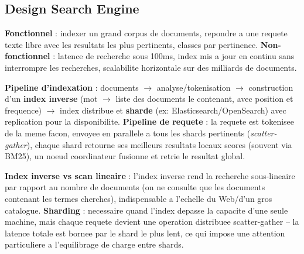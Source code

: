 \documentclass[11pt,a4paper]{article}
\newenvironment{sujet}[1]{%
  \subsection{#1}
}{%
  \bigskip
}
\begin{document}
\begin{sujet}{Design Search Engine}

\begin{req}
\textbf{Fonctionnel} : indexer un grand corpus de documents, repondre a une requete texte libre avec les resultats les plus pertinents, classes par pertinence. \textbf{Non-fonctionnel} : latence de recherche sous 100ms, index mis a jour en continu sans interrompre les recherches, scalabilite horizontale sur des milliards de documents.
\end{req}

\begin{archbox}
\textbf{Pipeline d'indexation} : documents $\to$ analyse/tokenisation $\to$ construction d'un \textbf{index inverse} (mot $\to$ liste des documents le contenant, avec position et frequence) $\to$ index distribue et \textbf{sharde} (ex: Elasticsearch/OpenSearch) avec replication pour la disponibilite. \textbf{Pipeline de requete} : la requete est tokenisee de la meme facon, envoyee en parallele a tous les shards pertinents (\emph{scatter-gather}), chaque shard retourne ses meilleurs resultats locaux scores (souvent via BM25), un noeud coordinateur fusionne et retrie le resultat global.
\end{archbox}

\begin{tradeoff}
\textbf{Index inverse vs scan lineaire} : l'index inverse rend la recherche sous-lineaire par rapport au nombre de documents (on ne consulte que les documents contenant les termes cherches), indispensable a l'echelle du Web/d'un gros catalogue. \textbf{Sharding} : necessaire quand l'index depasse la capacite d'une seule machine, mais chaque requete devient une operation distribuee scatter-gather -- la latence totale est bornee par le shard le plus lent, ce qui impose une attention particuliere a l'equilibrage de charge entre shards.
\end{tradeoff}

\end{sujet}
\end{document}
